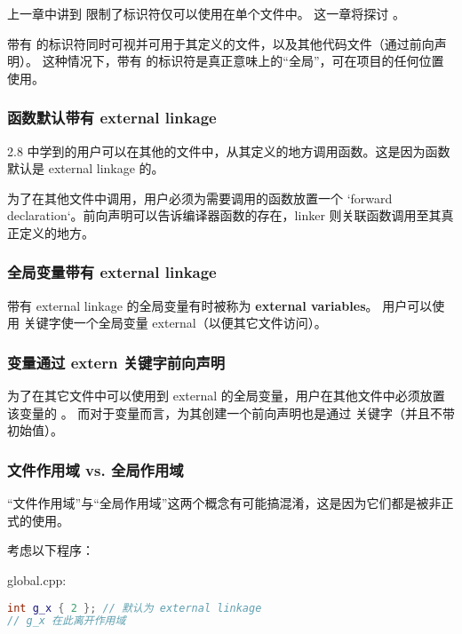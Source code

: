 \documentclass[../../LearnCpp.tex]{subfiles}
\begin{document}

上一章中讲到  限制了标识符仅可以使用在单个文件中。
这一章将探讨 。

带有  的标识符同时可视并可用于其定义的文件，以及其他代码文件（通过前向声明）。
这种情况下，带有  的标识符是真正意味上的“全局”，可在项目的任何位置使用。

\subsubsection*{函数默认带有 external linkage}

2.8 中学到的用户可以在其他的文件中，从其定义的地方调用函数。这是因为函数默认是 external linkage 的。

为了在其他文件中调用，用户必须为需要调用的函数放置一个 `forward declaration`。前向声明可以告诉编译器函数的存在，linker 则关联函数调用至其真正定义的地方。

\subsubsection*{全局变量带有 external linkage}

带有 external linkage 的全局变量有时被称为 \textbf{external variables}。
用户可以使用  关键字使一个全局变量 external（以便其它文件访问）。

\subsubsection*{变量通过 extern 关键字前向声明}

为了在其它文件中可以使用到 external 的全局变量，用户在其他文件中必须放置该变量的 。
而对于变量而言，为其创建一个前向声明也是通过  关键字（并且不带初始值）。

\subsubsection*{文件作用域 vs. 全局作用域}

“文件作用域”与“全局作用域”这两个概念有可能搞混淆，这是因为它们都是被非正式的使用。

考虑以下程序：

global.cpp:

\begin{lstlisting}[language=C++]
int g_x { 2 }; // 默认为 external linkage
// g_x 在此离开作用域
\end{lstlisting}
\end{document}
